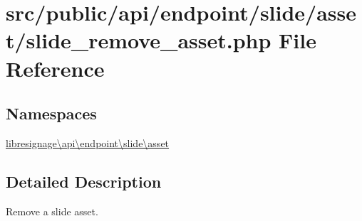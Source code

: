 \hypertarget{src_2public_2api_2endpoint_2slide_2asset_2slide__remove__asset_8php}{}\section{src/public/api/endpoint/slide/asset/slide\+\_\+remove\+\_\+asset.php File Reference}
\label{src_2public_2api_2endpoint_2slide_2asset_2slide__remove__asset_8php}
\subsection*{Namespaces}
\begin{DoxyCompactItemize}
\item 
 \hyperlink{namespacelibresignage_1_1api_1_1endpoint_1_1slide_1_1asset}{libresignage\textbackslash{}api\textbackslash{}endpoint\textbackslash{}slide\textbackslash{}asset}
\end{DoxyCompactItemize}


\subsection{Detailed Description}
Remove a slide asset.

